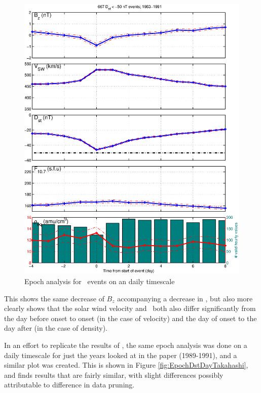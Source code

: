 \begin{figure}[htp!]
	\centering
	\includegraphics[width=0.7\linewidth]{Figures/StormAvs/stormavs-dst-day-GOES6}
	\caption{Epoch analysis for \dst\ events on an daily timescale}
	\label{fig:EpochDstDay}
\end{figure}

This shows the same decrease of $B_z$ accompanying a decrease in \dst, but also more clearly shows that the solar wind velocity and \req\ both also differ significantly from the day before onset to onset (in the case of velocity) and the day of onset to the day after (in the case of density). 

In an effort to replicate the results of \cite{Takahashi2010SolarCycleVariation}, the same epoch analysis was done on a daily timescale for just the years looked at in the paper (1989-1991), and a similar plot was created. This is shown in Figure \ref{fig:EpochDstDayTakahashi}, and finds results that are fairly similar, with slight differences possibly attributable to difference in data pruning. 

